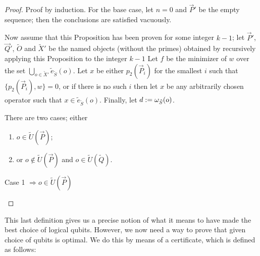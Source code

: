 \documentclass[twocolumn,showpacs,preprintnumbers,amsmath,amssymb,nofootinbib,pra,floatfix]{revtex4-1}
\newcommand{\lst}{\vec}
\newcommand{\set}{\tilde}
\begin{document}
\begin{proof}

Proof by induction.  For the base case, let $n=0$ and $\lst P'$ be the empty sequence;  then the conclusions are satisfied vacuously.

Now assume that this Proposition has been proven for some integer $k-1$;  let $\lst P'$, $\lst Q'$, $\set O$ and $\set X'$ be the named objects (without the primes) obtained by recursively applying this Proposition to the integer $k-1$  Let $f$ be the minimizer of $w$ over the set $\bigcup_{o\in\set X'} \set e_{\set S}(o)$.  Let $x$ be either $p_2(\lst P_i)$ for the smallest $i$ such that $\{p_2(\lst P_i),w\}=0$, or if there is no such $i$ then let $x$ be any arbitrarily chosen operator such that $x\in \set e_{\set S}(o)$.  Finally, let  $d:=\om_{\set S}(o)$.

There are two cases;  either
\begin{enumerate}
\item $o\in \set U(\lst P)$;
\item or $o\notin \set U(\lst P)$ and $o\in\set U(\set Q)$.
\end{enumerate}

\begin{description}

\item[Case 1 $\Rightarrow o\in\set U(\lst P)$]

\end{description}

\end{proof}
This last definition gives us a precise notion of what it means to have made the best choice of logical qubits.  However, we now need a way to prove that given choice of qubits is optimal.  We do this by means of a certificate, which is defined as follows:
\end{document}
